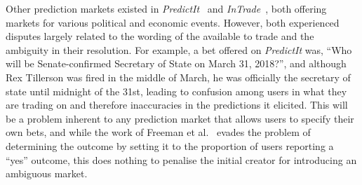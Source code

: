Other prediction markets existed in \emph{PredictIt}~\cite{PredictIt} and
\emph{InTrade}~\cite{InTrade}, both offering markets for various political and
economic events. However, both experienced disputes largely related to the
wording of the available to trade and the ambiguity in their resolution. For
example, a bet offered on \emph{PredictIt} was, ``Who will be Senate-confirmed
Secretary of State on March 31, 2018?'', and although Rex Tillerson was fired
in the middle of March, he was officially the secretary of state until midnight
of the 31st, leading to confusion among users in what they are trading on and
therefore inaccuracies in the predictions it elicited. This will be a problem
inherent to any prediction market that allows users to specify their own bets,
and while the work of Freeman et al.~\cite{Freeman2017} evades the problem of
determining the outcome by setting it to the proportion of users reporting a
``yes'' outcome, this does nothing to penalise the initial creator for
introducing an ambiguous market.
